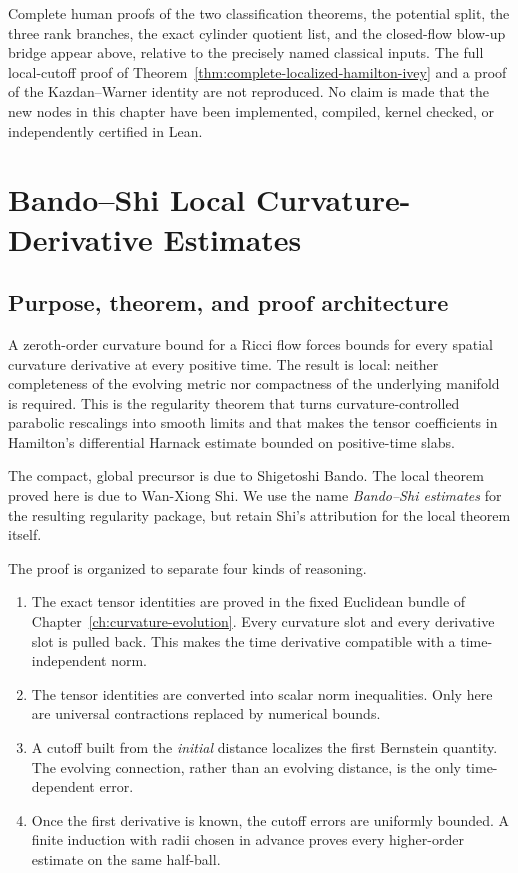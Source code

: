\documentclass[10pt]{coll-l}
\theoremstyle{definition}
\theoremstyle{remark}
\numberwithin{section}{chapter}
\numberwithin{equation}{chapter}
\begin{document}
Complete human proofs of the two classification theorems, the potential
split, the three rank branches, the exact cylinder quotient list, and the
closed-flow blow-up bridge appear above, relative to the precisely named
classical inputs.  The full local-cutoff proof of
Theorem~\ref{thm:complete-localized-hamilton-ivey} and a proof of the
Kazdan--Warner identity are not reproduced.  No claim is made that the new
nodes in this chapter have been implemented, compiled, kernel checked, or
independently certified in Lean.

\chapter{Bando--Shi Local Curvature-Derivative Estimates}
\label{ch:bando-shi}

\section{Purpose, theorem, and proof architecture}
\label{sec:shi-purpose}

A zeroth-order curvature bound for a Ricci flow forces bounds for every
spatial curvature derivative at every positive time.  The result is local:
neither completeness of the evolving metric nor compactness of the
underlying manifold is required.  This is the regularity theorem that turns
curvature-controlled parabolic rescalings into smooth limits and that makes
the tensor coefficients in Hamilton's differential Harnack estimate
bounded on positive-time slabs.

The compact, global precursor is due to Shigetoshi Bando.  The local theorem
proved here is due to Wan-Xiong Shi.  We use the name \emph{Bando--Shi
estimates} for the resulting regularity package, but retain Shi's attribution
for the local theorem itself.

The proof is organized to separate four kinds of reasoning.
\begin{enumerate}
\item The exact tensor identities are proved in the fixed Euclidean bundle
      of Chapter~\ref{ch:curvature-evolution}.  Every curvature slot and
      every derivative slot is pulled back.  This makes the time derivative
      compatible with a time-independent norm.
\item The tensor identities are converted into scalar norm inequalities.
      Only here are universal contractions replaced by numerical bounds.
\item A cutoff built from the \emph{initial} distance localizes the first
      Bernstein quantity.  The evolving connection, rather than an evolving
      distance, is the only time-dependent error.
\item Once the first derivative is known, the cutoff errors are uniformly
      bounded.  A finite induction with radii chosen in advance proves every
      higher-order estimate on the same half-ball.
\end{enumerate}
\end{document}
